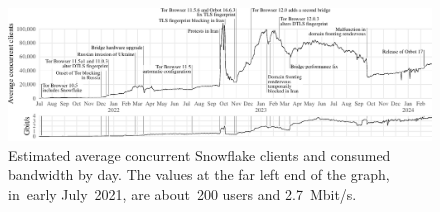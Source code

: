 \documentclass[letterpaper,twocolumn]{article}
\begin{document}
\begin{figure}[t]
\includegraphics{figures/users/users-global}
\caption{
Estimated average concurrent Snowflake clients and consumed bandwidth by day.
The values at the far left end of the graph,
in~early July~2021, are about~200 users
and 2.7~Mbit/s.
}
\end{figure}
\end{document}
